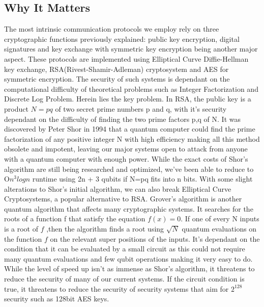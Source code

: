 \documentclass[10pt,a4paper]{article}
\begin{document}
\subsection{Why It Matters}
The most intrinsic communication protocols we employ rely on three cryptographic functions previously explained: public key encryption, digital signatures and key exchange with symmetric key encryption being another major aspect. These protocols are implemented using Elliptical Curve Diffie-Hellman key exchange, RSA(Rivest-Shamir-Adleman) cryptosystem and AES for symmetric encryption. The security of such systems is dependant on the computational difficulty of theoretical problems such as Integer Factorization and Discrete Log Problem.
\newline
Herein lies the key problem. In RSA, the public key is a product \(N = pq\) of two secret prime numbers p and q, with it's security dependant on the difficulty of finding the two prime factors p,q of N. It was discovered by Peter Shor in 1994 that a quantum computer could find the prime factorization of any positive integer N with high efficiency making all this method obsolete and impotent, leaving our major systems open to attack from anyone with a quantum computer with enough power. While the exact costs of Shor's algorithm are still being researched and optimized, we've been able to reduce to O\(n^3logn\) runtime using 2n + 3 qubits if N=pq fits into n bits. With some slight alterations to Shor's initial algorithm, we can also break Elliptical Curve Cryptosystems, a popular alternative to RSA. 
\newline
\newline
Grover's algorithm is another quantum algorithm that affects many cryptographic systems. It searches for the roots of a function f that satisfy the equation \(f(x) = 0\). If one of every N inputs is a root of \(f\) ,then the algorithm finds a root using \(\sqrt{N}\) quantum evaluations on the function \(f\) on the relevant super positions of the inputs. It's dependant on the condition that it can be evaluated by a small circuit as this could not require many quantum evaluations and few qubit operations making it very easy to do. While the level of speed up isn't as immense as Shor's algorithm, it threatens to reduce the security of many of our current systems. If the circuit condition is true, it threatens to reduce the security of security systems that aim for \(2^128\) security such as 128bit AES keys. 
\end{document}
